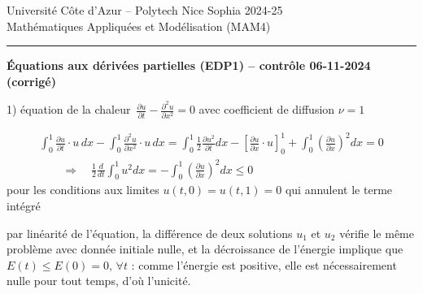 \documentclass[12pt,a4paper]{article}
\begin{document}
\noindent Universit\'e C\^ote d'Azur -- Polytech Nice Sophia 2024-25\\
\noindent Math\'ematiques Appliqu\'ees et Mod\'elisation (MAM4)\\

\hrule \bigskip

\begin{center}
{\bf \'Equations aux d\'eriv\'ees partielles (EDP1) -- contr\^ole 06-11-2024 (corrig\'e)}
\end{center}

\bigskip

1) \'equation de la chaleur $\,\displaystyle \frac{\partial u}{\partial t} - \frac{\partial^2 u}{\partial x^2} = 0$ avec coefficient de diffusion $\nu =1$

$$
\begin{array}{l}
\displaystyle \int_0^1 \frac{\partial u}{\partial t} \cdot u \,dx - \int_0^1 \frac{\partial^2 u}{\partial x^2} \cdot u \,dx = \int_0^1 \frac12 \frac{\partial u^2}{\partial t} dx - \left[ \frac{\partial u}{\partial x} \cdot u \right]_0^1 + \int_0^1 \left( \frac{\partial u}{\partial x} \right)^{\!\!2} dx = 0 \\[2ex]
\qquad \displaystyle \Longrightarrow \quad \frac12 \frac{d}{d t} \int_0^1 u^2 dx = - \int_0^1 \left( \frac{\partial u}{\partial x} \right)^{\!\!2} dx \leq 0
\end{array}
$$
pour les conditions aux limites $u(t,0)=u(t,1)=0$ qui annulent le terme intégré 

par lin\'earit\'e de l'\'equation, la diff\'erence de deux solutions $u_1$ et $u_2$ v\'erifie le m\^eme probl\`eme avec donn\'ee initiale nulle, et la d\'ecroissance de l'\'energie implique que $E(t)\leq E(0)=0,\,\forall t$ : comme l'énergie est positive, elle est nécessairement nulle pour tout 
temps, d'o\`u l'unicit\'e.\\

\end{document}
